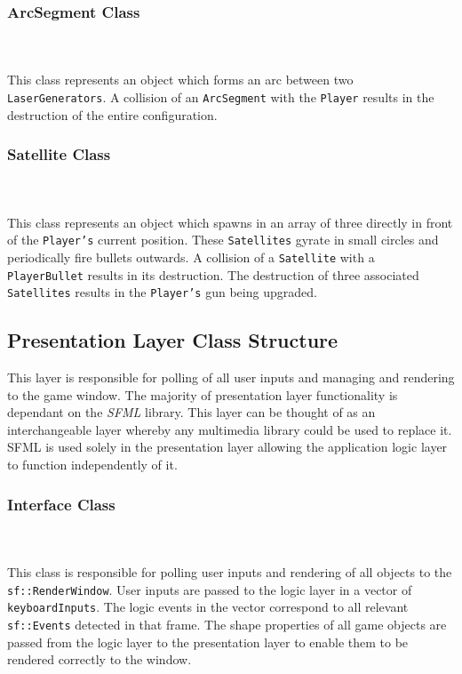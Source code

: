\documentclass[10pt,twocolumn]{witseiepaper}
\begin{document}
\subsubsection{ArcSegment Class}
~\\
~\\
This class represents an object which forms an arc between two \texttt{LaserGenerators}. A collision of an \texttt{ArcSegment} with the \texttt{Player} results in the destruction of the entire configuration.

\subsubsection{Satellite Class}
~\\
~\\
This class represents an object which spawns in an array of three directly in front of the \texttt{Player's} current position. These \texttt{Satellites} gyrate in small circles and periodically fire bullets outwards. A collision of a \texttt{Satellite} with a \texttt{PlayerBullet} results in its destruction. The destruction of three associated \texttt{Satellites} results in the \texttt{Player's} gun being upgraded.

\subsection{Presentation Layer Class Structure}

This layer is responsible for polling of all user inputs and managing and rendering to the game window. The majority of presentation layer functionality is dependant on the \textit{SFML} library. This layer can be thought of as an interchangeable layer whereby any multimedia library could be used to replace it. SFML is used solely in the presentation layer allowing the application logic layer to function independently of it.

\subsubsection{Interface Class}
~\\
~\\
This class is responsible for polling user inputs and rendering of all objects to the \texttt{sf::RenderWindow}. User inputs are passed to the logic layer in a vector of \texttt{keyboardInputs}. The logic events in the vector correspond to all relevant \texttt{sf::Events} detected in that frame. The shape properties of all game objects are passed from the logic layer to the presentation layer to enable them to be rendered correctly to the window. 
\end{document}
